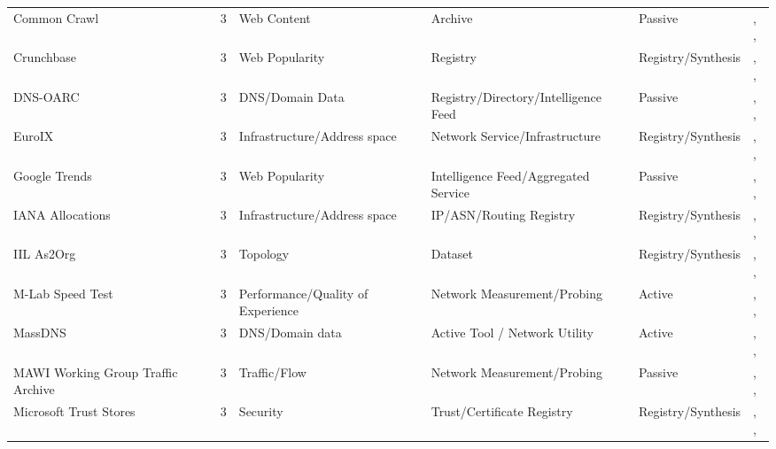 \begin{table}[h!]
\begin{tabular}{lllllll}
Common Crawl & \cite{commoncrawl} & 3 & Web Content & Archive & Passive & \cite{10.1145/3730567.3732913}, \cite{10.1145/3517745.3561437}, \cite{10.1007/978-3-031-85960-1_9} \\
Crunchbase & \cite{crunchbase} & 3 & Web Popularity & Registry & Registry/Synthesis & \cite{10.1145/3618257.3624803}, \cite{10.1145/3487552.3487853}, \cite{10.1145/3777912.3809155} \\
DNS-OARC & \cite{dns_oarc} & 3 & DNS/Domain Data & Registry/Directory/Intelligence Feed & Passive & \cite{10.1145/3730567.3764428}, \cite{10.1007/978-3-030-72582-2_23}, \cite{10.1145/3777912.3839813} \\
EuroIX & \cite{euroix} & 3 & Infrastructure/Address space & Network Service/Infrastructure & Registry/Synthesis & \cite{10.1145/3517745.3561443}, \cite{10.1007/978-3-030-98785-5_10}, \cite{10.1007/978-3-030-98785-5_16} \\
Google Trends & \cite{google_trends} & 3 & Web Popularity & Intelligence Feed/Aggregated Service & Passive & \cite{10.1145/3618257.3624823}, \cite{10.1145/3517745.3561428}, \cite{10.1145/3777912.3839818} \\
IANA Allocations & \cite{iana-allocation} & 3 & Infrastructure/Address space & IP/ASN/Routing Registry & Registry/Synthesis & \cite{10.1145/3730567.3764452}, \cite{10.1145/3517745.3561446}, \cite{10.1145/3487552.3487825} \\
IIL As2Org & \cite{10.1007/978-3-031-28486-1_15} & 3 & Topology & Dataset & Registry/Synthesis & \cite{10.1145/3777912.3839831}, \cite{10.1145/3777912.3809155}, \cite{10.1145/3777912.3839828} \\
M-Lab Speed Test & \cite{mlab-speedtest} & 3 & Performance/Quality of Experience & Network Measurement/Probing & Active & \cite{10.1145/3517745.3561422}, \cite{10.1145/3517745.3561441}, \cite{10.1145/3487552.3487862} \\
MassDNS & \cite{massdns} & 3 & DNS/Domain data & Active Tool / Network Utility & Active & \cite{10.1007/978-3-030-98785-5_13}, \cite{10.1007/978-3-032-18268-5_5}, \cite{10.1007/978-3-032-18268-5_10} \\
MAWI Working Group Traffic Archive & \cite{mawi-archive} & 3 & Traffic/Flow & Network Measurement/Probing & Passive & \cite{10.1007/978-3-030-72582-2_32}, \cite{10.1007/978-3-030-98785-5_9}, \cite{10.1007/978-3-031-56252-5_12} \\
Microsoft Trust Stores & \cite{microsoft-trust-stores} & 3 & Security & Trust/Certificate Registry & Registry/Synthesis & \cite{10.1145/3618257.3624815}, \cite{10.1007/978-3-030-72582-2_11}, \cite{10.1007/978-3-031-28486-1_4} \\

\end{tabular}
\end{table}
